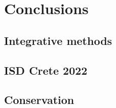 % 
% 


\chapter{Conclusions}
\label{cha:conclusions}

\section{Integrative methods}
\label{sec:integration}

\section{ISD Crete 2022}
\label{sec:isd-crete-2022}

\section{Conservation}
\label{sec:conservation}

% 
